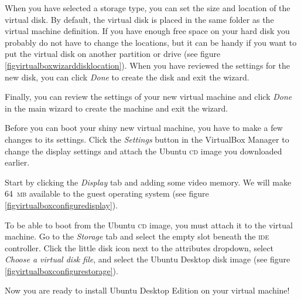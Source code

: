 \documentclass[draft,ebook,10pt,twoside,openright]{memoir}
\begin{document}

When you have selected a storage type, you can set the size and location of the virtual disk. By default, the virtual disk is placed in the same folder as the virtual machine definition. If you have enough free space on your hard disk you probably do not have to change the locations, but it can be handy if you want to put the virtual disk on another partition or drive (see figure \ref{figvirtualboxwizarddisklocation}). When you have reviewed the settings for the new disk, you can click \emph{Done} to create the disk and exit the wizard.


Finally, you can review the settings of your new virtual machine and click \emph{Done} in the main wizard to create the machine and exit the wizard.

Before you can boot your shiny new virtual machine, you have to make a few changes to its settings. Click the \emph{Settings} button in the VirtualBox Manager to change the display settings and attach the Ubuntu \textsc{cd} image you downloaded earlier.

Start by clicking the \emph{Display} tab and adding some video memory. We will make 64~\textsc{mb} available to the guest operating system (see figure \ref{figvirtualboxconfiguredisplay}).


To be able to boot from the Ubuntu \textsc{cd} image, you must attach it to the virtual machine. Go to the \emph{Storage} tab and select the empty slot beneath the \textsc{ide} controller. Click the little disk icon next to the attributes dropdown, select \emph{Choose a virtual  disk file}, and select the Ubuntu Desktop disk image (see figure \ref{figvirtualboxconfigurestorage}).


Now you are ready to install Ubuntu Desktop Edition on your virtual machine!

\end{document}
